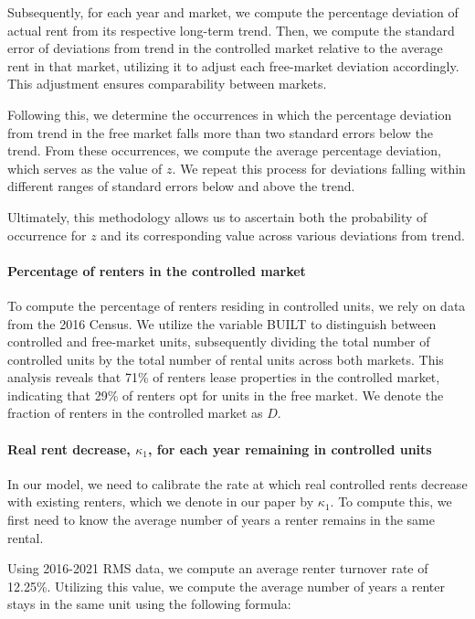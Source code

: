 \documentclass[parskip=full]{article}
\begin{document}
Subsequently, for each year and market, we compute the percentage deviation of actual rent from its respective long-term trend. Then, we compute the standard error of deviations from trend in the controlled market relative to the average rent in that market, utilizing it to adjust each free-market deviation accordingly. This adjustment ensures comparability between markets.

Following this, we determine the occurrences in which the percentage deviation from trend in the free market falls more than two standard errors below the trend. From these occurrences, we compute the average percentage deviation, which serves as the value of $z$. We repeat this process for deviations falling within different ranges of standard errors below and above the trend.

Ultimately, this methodology allows us to ascertain both the probability of occurrence for $z$ and its corresponding value across various deviations from trend.

\paragraph{Percentage of renters in the controlled market}

To compute the percentage of renters residing in controlled units, we rely on data from the 2016 Census. We utilize the variable BUILT to distinguish between controlled and free-market units, subsequently dividing the total number of controlled units by the total number of rental units across both markets. This analysis reveals that 71\% of renters lease properties in the controlled market, indicating that 29\% of renters opt for units in the free market. We denote the fraction of renters in the controlled market as $D$.

\paragraph{Real rent decrease, $\kappa_{1}$, for each year remaining in controlled units}

In our model, we need to calibrate the rate at which real controlled rents decrease  with existing renters, which we denote in our paper by $\kappa_{1}$. To compute this, we first need to know the average number of years a renter remains in the same rental. 

Using 2016-2021 RMS data, we compute an average renter turnover rate of 12.25\%. Utilizing this value, we compute the average number of years a renter stays in the same unit using the following formula:
\end{document}
